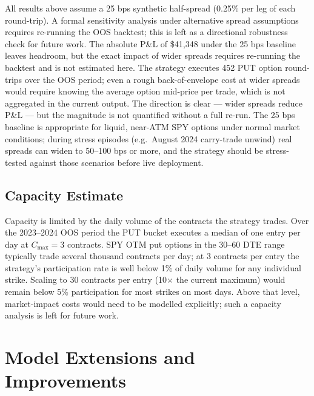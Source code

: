 \documentclass[10pt,twocolumn]{article}
\begin{document}
All results above assume a 25 bps synthetic half-spread (0.25\% per leg of
each round-trip).  A formal sensitivity analysis under alternative spread
assumptions requires re-running the OOS backtest; this is left as a
directional robustness check for future work.  The absolute P\&L of \$41,348 under the 25 bps baseline leaves headroom, but
the exact impact of wider spreads requires re-running the backtest and is not
estimated here.  The strategy executes 452 PUT option round-trips over the
OOS period; even a rough back-of-envelope cost at wider spreads would require
knowing the average option mid-price per trade, which is not aggregated in
the current output.  The direction is clear — wider spreads reduce P\&L —
but the magnitude is not quantified without a full re-run.  The 25 bps baseline is appropriate for liquid,
near-ATM SPY options under normal market conditions; during stress episodes
(e.g.\ August 2024 carry-trade unwind) real spreads can widen to 50--100 bps
or more, and the strategy should be stress-tested against those scenarios
before live deployment.

\subsection{Capacity Estimate}
\label{sec:capacity}

Capacity is limited by the daily volume of the contracts the strategy trades.
Over the 2023--2024 OOS period the PUT bucket executes a median of one entry per
day at $C_{\text{max}} = 3$ contracts.  SPY OTM put options in the 30--60 DTE
range typically trade several thousand contracts per day; at 3 contracts per
entry the strategy's participation rate is well below 1\% of daily volume
for any individual strike.  Scaling to 30 contracts per entry
(10$\times$ the current maximum) would remain below 5\% participation for
most strikes on most days.  Above that level, market-impact costs would need
to be modelled explicitly; such a capacity analysis is left for future work.

\section{Model Extensions and Improvements}
\end{document}
